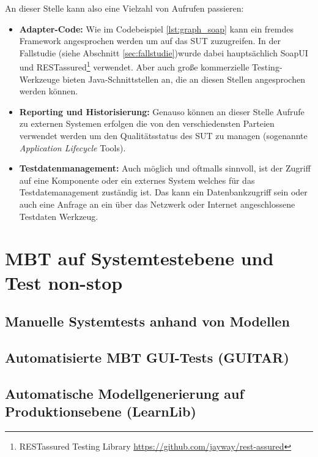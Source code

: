 An dieser Stelle kann also eine Vielzahl von Aufrufen passieren:

\begin{itemize}
\item \textbf{Adapter-Code:} Wie im Codebeispiel \ref{lst:graph_soap} kann ein fremdes Framework angesprochen werden um auf das SUT zuzugreifen. In der Fallstudie (siehe Abschnitt \ref{sec:fallstudie})wurde dabei hauptsächlich SoapUI und RESTassured\footnote{RESTassured Testing Library \url{https://github.com/jayway/rest-assured}} verwendet. Aber auch große kommerzielle Testing-Werkzeuge bieten Java-Schnittstellen an, die an diesen Stellen angesprochen werden können.
\item \textbf{Reporting und Historisierung:} Genauso können an dieser Stelle Aufrufe zu externen Systemen erfolgen die von den verschiedensten Parteien verwendet werden um den Qualitätsstatus des SUT zu managen (sogenannte \textit{Application Lifecycle} Tools). 
\item \textbf{Testdatenmanagement:} Auch möglich und oftmalls sinnvoll, ist der Zugriff auf eine Komponente oder ein externes System welches für das Testdatemanagement zuständig ist. Das kann ein Datenbankzugriff sein oder auch eine Anfrage an ein über das Netzwerk oder Internet angeschlossene Testdaten Werkzeug.
\end{itemize}

\section{MBT auf Systemtestebene und Test non-stop}
\subsection{Manuelle Systemtests anhand von Modellen}
\subsection{Automatisierte MBT GUI-Tests (GUITAR)}
\subsection{Automatische Modellgenerierung auf Produktionsebene (LearnLib)}